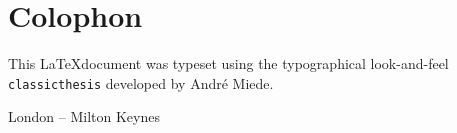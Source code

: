 \pagestyle{empty}

\hfill

\vfill


\section*{Colophon}
This \LaTeX document was typeset using the typographical look-and-feel \texttt{classicthesis} developed by Andr\'e Miede. 

\begin{center}
London -- Milton Keynes
\end{center}
 
\bigskip

\noindent\finalVersionString


